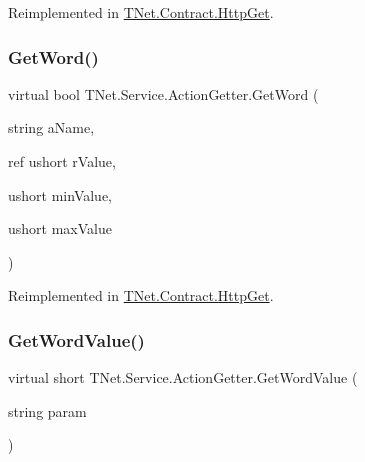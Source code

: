 Reimplemented in \mbox{\hyperlink{class_t_net_1_1_contract_1_1_http_get_a10445a4a1803e0e4f073282c9c4dd754}{T\+Net.\+Contract.\+Http\+Get}}.

\mbox{\label{class_t_net_1_1_service_1_1_action_getter_a5ef686fe56be0128c3232df533d88580}} 
\subsubsection{\texorpdfstring{Get\+Word()}{GetWord()}\hspace{0.1cm}{\footnotesize\ttfamily [5/5]}}
{\footnotesize\ttfamily virtual bool T\+Net.\+Service.\+Action\+Getter.\+Get\+Word (\begin{DoxyParamCaption}\item[{string}]{a\+Name,  }\item[{ref ushort}]{r\+Value,  }\item[{ushort}]{min\+Value,  }\item[{ushort}]{max\+Value }\end{DoxyParamCaption})\hspace{0.3cm}{\ttfamily [virtual]}}







Reimplemented in \mbox{\hyperlink{class_t_net_1_1_contract_1_1_http_get_a987ed559553d8e373939b6b97dc00dec}{T\+Net.\+Contract.\+Http\+Get}}.

\mbox{\label{class_t_net_1_1_service_1_1_action_getter_a8be520b300536485ba4108a52b2c9310}} 
\subsubsection{\texorpdfstring{Get\+Word\+Value()}{GetWordValue()}\hspace{0.1cm}{\footnotesize\ttfamily [1/2]}}
{\footnotesize\ttfamily virtual short T\+Net.\+Service.\+Action\+Getter.\+Get\+Word\+Value (\begin{DoxyParamCaption}\item[{string}]{param }\end{DoxyParamCaption})\hspace{0.3cm}{\ttfamily [virtual]}}







